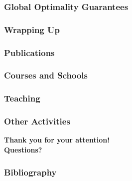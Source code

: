 \documentclass{beamer}
\begin{document}
\begin{frame}
\frametitle{Global Optimality Guarantees}
\end{frame}


\begin{frame}
\frametitle{Wrapping Up}
\end{frame}

\begin{frame}
\frametitle{Publications}
\end{frame}

\begin{frame}
\frametitle{Courses and Schools}
\end{frame}

\begin{frame}
\frametitle{Teaching}
\end{frame}

\begin{frame}
\frametitle{Other Activities}
\end{frame}



\begin{frame}[plain]
\centering
{\color{poliblue3} \bf
\vspace{1cm}
{\huge Thank you for your attention!} \\
\vspace{2cm}
{\LARGE Questions?}
}
\end{frame}


\begin{frame}[allowframebreaks]
\frametitle{Bibliography}



\end{frame}

\end{document}

